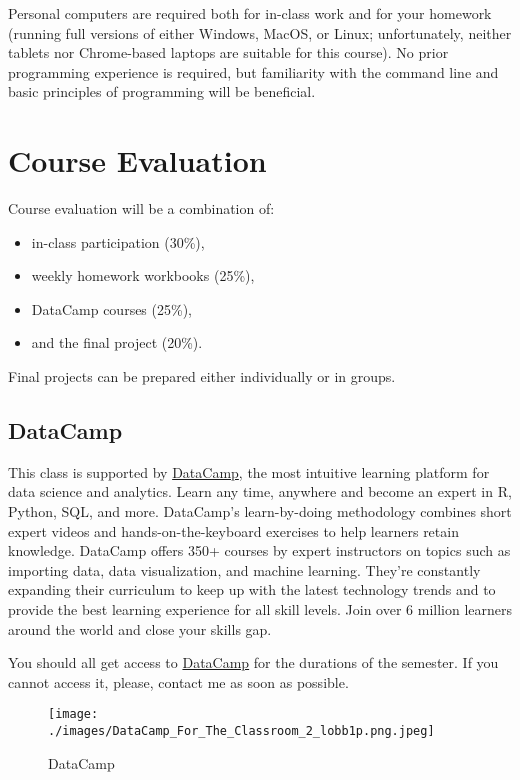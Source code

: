 \documentclass[
]{book}
\providecommand{\tightlist}{%
  \setlength{\itemsep}{0pt}\setlength{\parskip}{0pt}}
\begin{document}
Personal computers are required both for in-class work and for your homework (running full versions of either Windows, MacOS, or Linux; unfortunately, neither tablets nor Chrome-based laptops are suitable for this course). No prior programming experience is required, but familiarity with the command line and basic principles of programming will be beneficial.

\hypertarget{course-evaluation}{%
\section{Course Evaluation}\label{course-evaluation}}

Course evaluation will be a combination of:

\begin{itemize}
\tightlist
\item
  in-class participation (30\%),
\item
  weekly homework workbooks (25\%),
\item
  DataCamp courses (25\%),
\item
  and the final project (20\%).
\end{itemize}

Final projects can be prepared either individually or in groups.

\hypertarget{datacamp}{%
\subsection{DataCamp}\label{datacamp}}

This class is supported by \href{https://www.datacamp.com/}{DataCamp}, the most intuitive learning platform for data science and analytics. Learn any time, anywhere and become an expert in R, Python, SQL, and more. DataCamp's learn-by-doing methodology combines short expert videos and hands-on-the-keyboard exercises to help learners retain knowledge. DataCamp offers 350+ courses by expert instructors on topics such as importing data, data visualization, and machine learning. They're constantly expanding their curriculum to keep up with the latest technology trends and to provide the best learning experience for all skill levels. Join over 6 million learners around the world and close your skills gap.

You should all get access to \href{https://www.datacamp.com/}{DataCamp} for the durations of the semester. If you cannot access it, please, contact me as soon as possible.

\begin{figure}
\centering
\texttt{[image: ./images/DataCamp\_For\_The\_Classroom\_2\_lobb1p.png.jpeg]}
\caption{DataCamp}
\end{figure}
\end{document}
